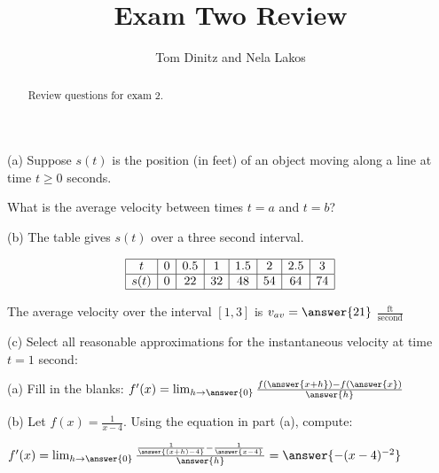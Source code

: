 \documentclass{ximera}
\author{Tom Dinitz and Nela Lakos}
\title{Exam Two Review}
\begin{document}
\begin{abstract}
Review questions for exam 2.
\end{abstract}
\maketitle

\begin{exercise}
(a) Suppose $s(t)$ is the position (in feet) of an object moving along a line at time $t\geq 0$ seconds. 

What is the average velocity between times $t=a$ and $t=b$?
\begin{prompt}
\begin{multipleChoice}
\end{multipleChoice}
\end{prompt}

(b) The table gives $s(t)$ over a three second interval.

\[
\begin{array}{|c|c|c|c|c|c|c|c|}
\hline
t& 0& 0.5& 1& 1.5& 2& 2.5& 3\\ \hline
s(t)& 0 & 22 & 32 & 48 & 54 & 64 & 74 \\ \hline
\end{array}
\]

The average velocity over the interval $[1,3]$ is $v_{av}=\answer{21}$ $\frac{\text{ft}}{\text{second}}$

(c) Select all reasonable approximations for the instantaneous velocity at time $t=1$ second:
\begin{selectAll}
\end{selectAll}
\end{exercise}

\begin{exercise}
(a) Fill in the blanks: $f'(x)=\lim_{h\to\answer{0}}\frac{f(\answer{x+h})-f(\answer{x})}{\answer{h}}$

(b) Let $f(x)=\frac{1}{x-4}$. Using the equation in part (a), compute:

$f'(x)=\lim_{h\to\answer{0}}\frac{\frac{1}{\answer{(x+h)-4}}-\frac{1}{\answer{x-4}}}{\answer{h}}=\answer{-(x-4)^{-2}}$

\end{exercise}
\end{document}
